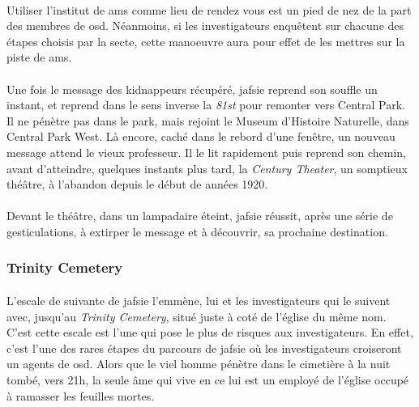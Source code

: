 \paragraph{} Utiliser l'institut de \gls{ams} comme lieu de rendez vous est un pied de nez de la part des membres de \gls{osd}. Néanmoins, 
si les investigateurs enquêtent sur chacune des étapes choisis par la secte, cette manoeuvre aura pour effet de les mettres sur la piste
de \gls{ams}.

\paragraph{} Une fois le message des kidnappeurs récupéré, \gls{jafsie} reprend son souffle un instant, et reprend dans le sens inverse 
la \emph{81st} pour remonter vers Central Park. Il ne pénètre pas dans le park, mais rejoint le Museum d'Histoire Naturelle, dans Central
Park West. Là encore, caché dans le rebord d'une fenêtre, un nouveau message attend le vieux professeur. Il le lit rapidement puis reprend
son chemin, avant d'atteindre, quelques instants plus tard, la \emph{Century Theater}, un somptieux théâtre, à l'abandon depuis le début 
de années 1920.


\paragraph{} Devant le théâtre, dans un lampadaire éteint, \gls{jafsie} réussit, après une série de gesticulations, à extirper le message 
et à découvrir, sa prochaine destination.

\subsubsection{Trinity Cemetery}

\paragraph{} L'escale de suivante de \gls{jafsie} l'emmène, lui et les investigateurs qui le suivent avec, jusqu'au 
\emph{Trinity Cemetery}, situé juste à coté de l'église du même nom. C'est cette escale est l'une qui pose le plus de risques 
aux investigateurs. En effet, c'est l'une des rares étapes du parcours de \gls{jafsie} où les investigateurs croiseront un agents de
\gls{osd}. Alors que le viel homme pénètre dans le cimetière à la nuit tombé, vers 21h, la seule âme qui vive en ce lui est un employé
de l'église occupé à ramasser les feuilles mortes.

